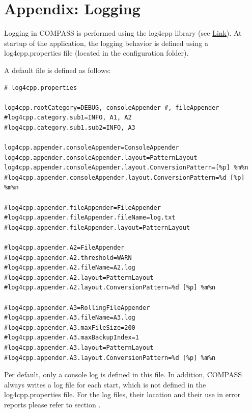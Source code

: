 \section{Appendix: Logging}
\label{sec:appendix_logging}
 
Logging in COMPASS is performed using the log4cpp library (see \href{https://log4cpp.sourceforge.net/}{Link}). At startup of the application, the logging behavior is defined using a log4cpp.properties file (located in the configuration folder).

A default file is defined as follows:
\begin{lstlisting}
# log4cpp.properties

log4cpp.rootCategory=DEBUG, consoleAppender #, fileAppender
#log4cpp.category.sub1=INFO, A1, A2
#log4cpp.category.sub1.sub2=INFO, A3

log4cpp.appender.consoleAppender=ConsoleAppender
log4cpp.appender.consoleAppender.layout=PatternLayout
log4cpp.appender.consoleAppender.layout.ConversionPattern=[%p] %m%n 
#log4cpp.appender.consoleAppender.layout.ConversionPattern=%d [%p] %m%n 

#log4cpp.appender.fileAppender=FileAppender
#log4cpp.appender.fileAppender.fileName=log.txt
#log4cpp.appender.fileAppender.layout=PatternLayout

#log4cpp.appender.A2=FileAppender
#log4cpp.appender.A2.threshold=WARN
#log4cpp.appender.A2.fileName=A2.log
#log4cpp.appender.A2.layout=PatternLayout
#log4cpp.appender.A2.layout.ConversionPattern=%d [%p] %m%n 

#log4cpp.appender.A3=RollingFileAppender
#log4cpp.appender.A3.fileName=A3.log
#log4cpp.appender.A3.maxFileSize=200
#log4cpp.appender.A3.maxBackupIndex=1
#log4cpp.appender.A3.layout=PatternLayout
#log4cpp.appender.A3.layout.ConversionPattern=%d [%p] %m%n 
\end{lstlisting}

Per default, only a console log is defined in this file. In addition, COMPASS always writes a log file for each start, which is not defined in the log4cpp.properties file. For the log files, their location and their use in error reports please refer to section .

